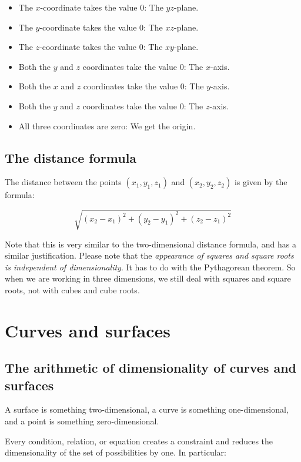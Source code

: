\documentclass[10pt]{amsart}
\begin{document}
\begin{itemize}
\item The $x$-coordinate takes the value $0$: The $yz$-plane.
\item The $y$-coordinate takes the value $0$: The $xz$-plane.
\item The $z$-coordinate takes the value $0$: The $xy$-plane.
\item Both the $y$ and $z$ coordinates take the value $0$: The
  $x$-axis.
\item Both the $x$ and $z$ coordinates take the value $0$: The
  $y$-axis.
\item Both the $y$ and $z$ coordinates take the value $0$: The
  $z$-axis.
\item All three coordinates are zero: We get the origin.
\end{itemize} 

\subsection{The distance formula}

The distance between the points $(x_1,y_1,z_1)$ and $(x_2,y_2,z_2)$ is
given by the formula:

$$\sqrt{(x_2 - x_1)^2 + (y_2 - y_1)^2 + (z_2 - z_1)^2}$$

Note that this is very similar to the two-dimensional distance
formula, and has a similar justification. Please note that the {\em
appearance of squares and square roots is independent of
dimensionality}. It has to do with the Pythagorean theorem. So when we
are working in three dimensions, we still deal with squares and square
roots, not with cubes and cube roots.

\section{Curves and surfaces}

\subsection{The arithmetic of dimensionality of curves and surfaces}

A surface is something two-dimensional, a curve is something
one-dimensional, and a point is something zero-dimensional.

Every condition, relation, or equation creates a constraint and
reduces the dimensionality of the set of possibilities by one. In
particular:
\end{document}

